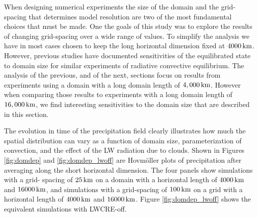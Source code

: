 \documentclass[draft]{agujournal2019}
\begin{document}
When designing numerical experiments the size of the domain and the grid-spacing that determines model resolution are 
two of the most fundamental choices that must be made.   One the goals of this study was to explore the results of 
changing grid-spacing over a wide range of values.  To simplify the analysis we have in most cases chosen to keep the 
long horizontal dimension fixed at $4000\, \rm{km}$.  However, previous studies 
\cite{Bretherton2005, Bretherton_etal_2006, Muller2012, Jeevanjee2013, Silvers2016, Patrizio2019}
have documented sensitivities of the equilibrated state to domain size for similar experiments
of radiative convective equilibrium.   
The analysis of the previous, and of the next, sections focus on results from 
experiments using a domain with a long domain length of $4,000 \, \rm{km}$.  However when comparing those results
to experiments with a long domain length of $16,000 \, \rm{km}$, we find interesting 
sensitivities to the domain size that are described in this section. 

The evolution in time of the precipitation field clearly illustrates how much the spatial distribution can vary as a 
function of domain size, parameterization of convection, and the effect of the LW radiation due to clouds. 
Shown in Figures {\ref{fig:domdep}} and {\ref{fig:domdep_lwoff}} are Hovm{\"o}ller plots of precipitation after 
averaging along the short horizontal dimension.  The four panels show simulations with a grid-
spacing of $25\, \rm{km}$ on a domain with a horizontal length of $4000\, \rm{km}$ and $16000\, \rm{km}$, and 
simulations with a grid-spacing of $100\, \rm{km}$ on a grid with a horizontal length of $4000\, \rm{km}$ and 
$16000\, \rm{km}$.  Figure  {\ref{fig:domdep_lwoff}} shows the equivalent simulations with LWCRE-off.    
\end{document}
